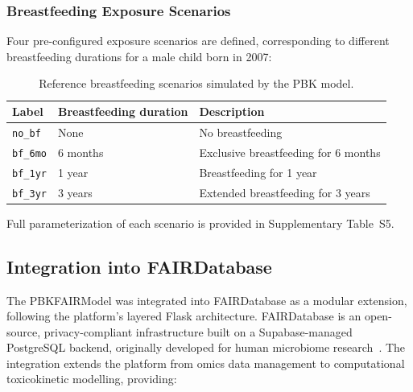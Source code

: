 \documentclass[preprint,12pt]{elsarticle}
\begin{document}
\begin{linenumbers}
\subsubsection{Breastfeeding Exposure Scenarios}


Four pre-configured exposure scenarios are defined, corresponding to
different breastfeeding durations for a male child born in 2007:

\begin{table}[h]
\centering
\caption{Reference breastfeeding scenarios simulated by the PBK model.}
\label{tab:scenarios}
\begin{tabular}{lll}
\toprule
\textbf{Label} & \textbf{Breastfeeding duration} & \textbf{Description} \\
\midrule
\texttt{no\_bf}  & None     & No breastfeeding \\
\texttt{bf\_6mo} & 6 months & Exclusive breastfeeding for 6 months \\
\texttt{bf\_1yr} & 1 year   & Breastfeeding for 1 year \\
\texttt{bf\_3yr} & 3 years  & Extended breastfeeding for 3 years \\
\bottomrule
\end{tabular}
\end{table}

Full parameterization of each scenario is provided in Supplementary
Table~S5.

\subsection{Integration into FAIRDatabase}


The PBKFAIRModel was integrated into FAIRDatabase as a modular
extension, following the platform's layered Flask architecture.
FAIRDatabase is an open-source, privacy-compliant infrastructure
built on a Supabase-managed PostgreSQL backend, originally developed
for human microbiome research~\cite{dorst2024, roman2026}. The
integration extends the platform from omics data management to
computational toxicokinetic modelling, providing:


\end{linenumbers}
\end{document}
